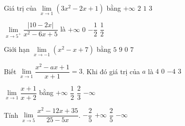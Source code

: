 \begin{ex}%
	Giá trị của  $\lim\limits_{x\to 1}\left(3 x^2-2 x+1\right)$ bằng
	\choice 
		 {$+\infty$}
		{\True $2$} 
		 {$1$}
		 {$3$}
\end{ex}

\begin{ex}%
	$\lim\limits_{x\to 5^+} \dfrac{\left| 10-2x \right|}{x^2-6x+5}$ là 
	 \choice
		 {$+\infty $}
		{$0$} 
		{$-\dfrac{1}{2}$} 
		{\True  $\dfrac{1}{2}$}
\end{ex}

\begin{ex}%
	Giới  hạn $\lim\limits_{x\to-1}\left(x^2-x+7\right)$ bằng
	 \choice
		{$5$} 
		{\True $9$} 
		{$0$} 
		 {$7$}
\end{ex}

\begin{ex}%
	Biết  $\lim\limits_{x\to 1}\dfrac{x^2-ax+1}{x+1}=3$. Khi đó giá trị của $a$ là
	 \choice
		 {$4$}
		{$0$} 
		 {\True $-4$}
		{$3$} 
\end{ex}

\begin{ex}%
	 $\lim\limits_{x\to 1}\dfrac{x+1}{x+2}$ bằng
	\choice 
		{$+\infty$} 
		 {$\dfrac{1}{2}$}
		 {\True $\dfrac{2}{3}$}
		 {$-\infty$}
\end{ex}

\begin{ex}%
	Tính  $\lim\limits_{x \to 5}\dfrac{x^2-12x+35}{25-5x}$.
	 \choice
		 {$-\dfrac{2}{5}$}
		 {$+\infty $}
		{\True $\dfrac{2}{5}$} 
		{$-\infty  $}
\end{ex}

